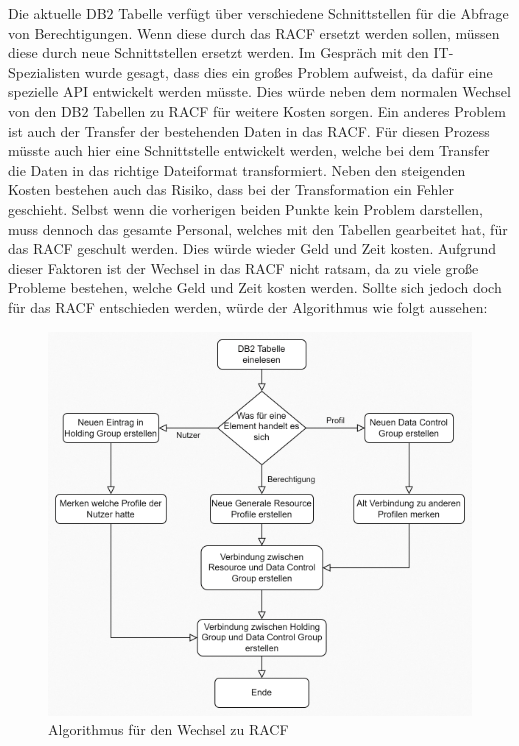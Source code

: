 Die aktuelle DB$2$ Tabelle verfügt über verschiedene Schnittstellen für die Abfrage von Berechtigungen.
Wenn diese durch das \ac{RACF} ersetzt werden sollen, müssen diese durch neue Schnittstellen ersetzt werden.
Im Gespräch mit den IT-Spezialisten wurde gesagt, dass dies ein großes Problem aufweist, da dafür eine spezielle \ac{API} entwickelt werden müsste.
Dies würde neben dem normalen Wechsel von den DB$2$ Tabellen zu \ac{RACF} für weitere Kosten sorgen.
\newline
Ein anderes Problem ist auch der Transfer der bestehenden Daten in das \ac{RACF}.
Für diesen Prozess müsste auch hier eine Schnittstelle entwickelt werden, welche bei dem Transfer die Daten in das richtige Dateiformat transformiert.
Neben den steigenden Kosten bestehen auch das Risiko, dass bei der Transformation ein Fehler geschieht.
\newline
Selbst wenn die vorherigen beiden Punkte kein Problem darstellen, muss dennoch das gesamte Personal, welches mit den Tabellen gearbeitet hat, für das \ac{RACF} geschult werden.
Dies würde wieder Geld und Zeit kosten.
Aufgrund dieser Faktoren ist der Wechsel in das \ac{RACF} nicht ratsam, da zu viele große Probleme bestehen, welche Geld und Zeit kosten werden.
\newline
Sollte sich jedoch doch für das \ac{RACF} entschieden werden, würde der Algorithmus wie folgt aussehen:
\begin{figure}[h!]
 \centering
 \includegraphics[width=1\textwidth]{gfx/Picture/racf.PNG}
 \caption{Algorithmus für den Wechsel zu RACF}
 \label{fig:racf}
\end{figure}